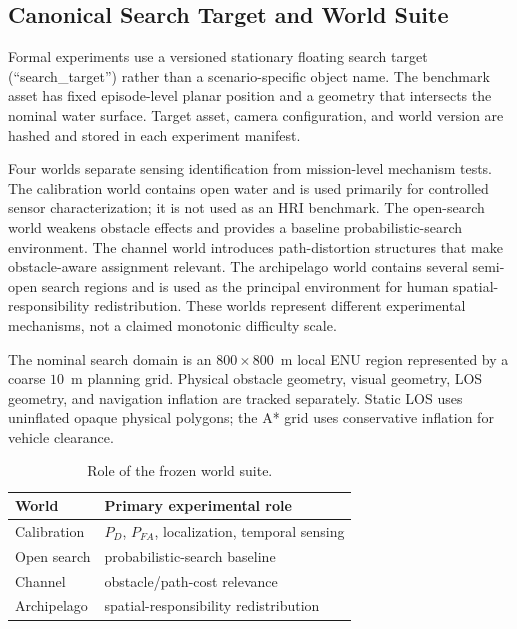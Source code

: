\documentclass[conference]{IEEEtran}
\begin{document}
\subsection{Canonical Search Target and World Suite}

Formal experiments use a versioned stationary floating search target
(``search\_target'') rather than a scenario-specific object name. The benchmark
asset has fixed episode-level planar position and a geometry that intersects
the nominal water surface. Target asset, camera configuration, and world
version are hashed and stored in each experiment manifest.

Four worlds separate sensing identification from mission-level mechanism tests.
The calibration world contains open water and is used primarily for controlled
sensor characterization; it is not used as an HRI benchmark. The open-search world weakens obstacle effects and
provides a baseline probabilistic-search environment. The channel world
introduces path-distortion structures that make obstacle-aware assignment
relevant. The archipelago world contains several semi-open search regions and
is used as the principal environment for human spatial-responsibility
redistribution. These worlds represent different experimental mechanisms,
not a claimed monotonic difficulty scale.

The nominal search domain is an $800\times800$~m local ENU region represented
by a coarse $10$~m planning grid. Physical obstacle geometry, visual geometry,
LOS geometry, and navigation inflation are tracked separately. Static LOS uses
uninflated opaque physical polygons; the A* grid uses conservative inflation
for vehicle clearance.

\begin{table}[t]
\centering
\caption{Role of the frozen world suite.}
\label{tab:worlds}
\small
\setlength{\tabcolsep}{3.5pt}
\begin{tabular}{ll}
\toprule
World & Primary experimental role\\
\midrule
Calibration & $P_D$, $P_{FA}$, localization, temporal sensing\\
Open search & probabilistic-search baseline\\
Channel & obstacle/path-cost relevance\\
Archipelago & spatial-responsibility redistribution\\
\bottomrule
\end{tabular}
\end{table}
\end{document}
